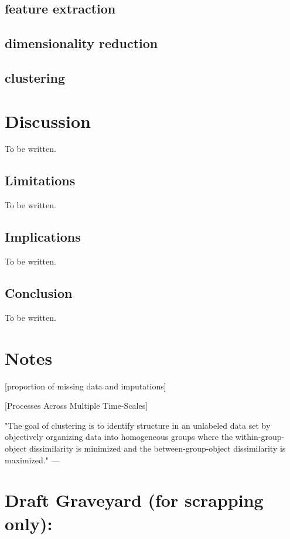 \documentclass[man, 12pt, a4paper]{apa7}
\theoremstyle{break}
\theoremstyle{plain}
\begin{document}
\subsection{feature extraction}

\subsection{dimensionality reduction}

\subsection{clustering}




\section{Discussion}
To be written.

\subsection{Limitations}
To be written.

\subsection{Implications}
To be written.


\subsection{Conclusion}
To be written.




\section{Notes}

\citep[][]{Madley-Dowd2019} [proportion of missing data and imputations]

\citep[e.g., see][]{Ram2014} [Processes Across Multiple Time-Scales]

"The goal of clustering is to identify structure in an unlabeled data set by objectively organizing data into homogeneous groups where the within-group-object dissimilarity is minimized and the between-group-object dissimilarity is maximized." --- \citep[][p.1857]{liao2005}

\section{Draft Graveyard (for scrapping only):}
\end{document}
